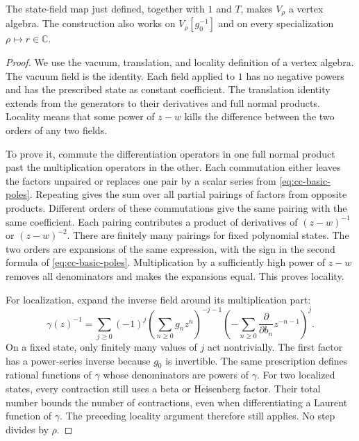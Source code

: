 \begin{lemma}\label{lem:cc-vertex-construction}
The state-field map just defined, together with $1$ and $T$, makes $V_\rho$ a vertex algebra.
The construction also works on $V_\rho[g_0^{-1}]$ and on every specialization $\rho\mapsto r\in\mathbb C$.
\end{lemma}
\begin{proof}
We use the vacuum, translation, and locality definition of a vertex algebra.
The vacuum field is the identity.
Each field applied to $1$ has no negative powers and has the prescribed state as constant coefficient.
The translation identity extends from the generators to their derivatives and full normal products.
Locality means that some power of $z-w$ kills the difference between the two orders of any two fields.

To prove it, commute the differentiation operators in one full normal product past the multiplication operators in the other.
Each commutation either leaves the factors unpaired or replaces one pair by a scalar series from \eqref{eq:cc-basic-poles}.
Repeating gives the sum over all partial pairings of factors from opposite products.
Different orders of these commutations give the same pairing with the same coefficient.
Each pairing contributes a product of derivatives of $(z-w)^{-1}$ or $(z-w)^{-2}$.
There are finitely many pairings for fixed polynomial states.
The two orders are expansions of the same expression, with the sign in the second formula of \eqref{eq:cc-basic-poles}.
Multiplication by a sufficiently high power of $z-w$ removes all denominators and makes the expansions equal.
This proves locality.

For localization, expand the inverse field around its multiplication part:
\[
 \gamma(z)^{-1}=\sum_{j\geq0}(-1)^j
 \left(\sum_{n\geq0}g_nz^n\right)^{-j-1}
 \left(-\sum_{n\geq0}\frac{\partial}{\partial b_n}z^{-n-1}\right)^j.
\]
On a fixed state, only finitely many values of $j$ act nontrivially.
The first factor has a power-series inverse because $g_0$ is invertible.
The same prescription defines rational functions of $\gamma$ whose denominators are powers of $\gamma$.
For two localized states, every contraction still uses a beta or Heisenberg factor.
Their total number bounds the number of contractions, even when differentiating a Laurent function of $\gamma$.
The preceding locality argument therefore still applies.
No step divides by $\rho$.


\end{proof}
